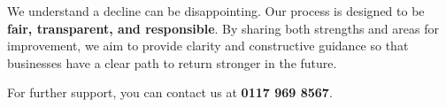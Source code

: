 \documentclass[a4paper,12pt]{article} %
\begin{document}
\smallskip
\noindent %
\makebox[\linewidth]{\rule{\textwidth}{0.4pt}} %
\smallskip

\medskip

\noindent We understand a decline can be disappointing. Our process is designed to be {\bf fair, transparent, and responsible}. By sharing both strengths and areas for improvement, we aim to provide clarity and constructive guidance so that businesses have a clear path to return stronger in the future.

\medskip
\noindent For further support, you can contact us at {\bf 0117 969 8567}.
\end{document}
